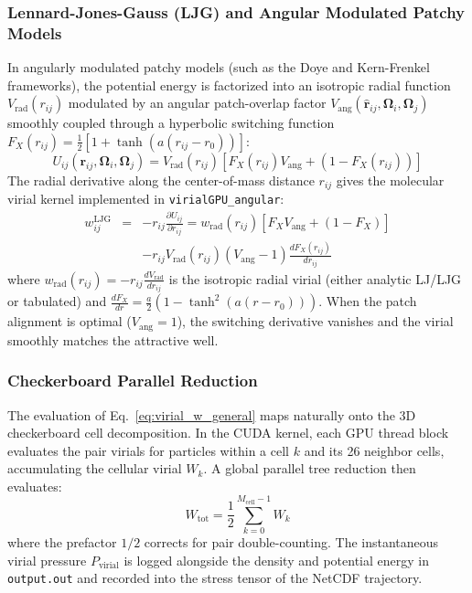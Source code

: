 \documentclass[final,5p,times,twocolumn]{elsarticle}
\begin{document}
\subsubsection{Lennard-Jones-Gauss (LJG) and Angular Modulated Patchy Models}
In angularly modulated patchy models (such as the Doye and Kern-Frenkel frameworks), the potential energy is factorized into an isotropic radial function $V_{\text{rad}}(r_{ij})$ modulated by an angular patch-overlap factor $V_{\text{ang}}(\hat{\mathbf{r}}_{ij}, \mathbf{\Omega}_i, \mathbf{\Omega}_j)$ smoothly coupled through a hyperbolic switching function $F_X(r_{ij}) = \frac{1}{2}\left[1 + \tanh(a(r_{ij} - r_0))\right]$:
\begin{equation}
    U_{ij}(\mathbf{r}_{ij}, \mathbf{\Omega}_i, \mathbf{\Omega}_j) = V_{\text{rad}}(r_{ij}) \left[ F_X(r_{ij}) V_{\text{ang}} + (1 - F_X(r_{ij})) \right]
\end{equation}
The radial derivative along the center-of-mass distance $r_{ij}$ gives the molecular virial kernel implemented in \texttt{virialGPU\_angular}:
\begin{eqnarray}
  w_{ij}^{\text{LJG}} &=& -r_{ij} \frac{\partial U_{ij}}{\partial r_{ij}} = w_{\text{rad}}(r_{ij}) \left[ F_X V_{\text{ang}} + (1 - F_X) \right]\nonumber \\
  & & - r_{ij} V_{\text{rad}}(r_{ij}) (V_{\text{ang}} - 1) \frac{dF_X(r_{ij})}{dr_{ij}}
\end{eqnarray}
where $w_{\text{rad}}(r_{ij}) = -r_{ij} \frac{dV_{\text{rad}}}{dr_{ij}}$ is the isotropic radial virial (either analytic LJ/LJG or tabulated) and $\frac{dF_X}{dr} = \frac{a}{2}(1 - \tanh^2(a(r - r_0)))$. When the patch alignment is optimal ($V_{\text{ang}} = 1$), the switching derivative vanishes and the virial smoothly matches the attractive well.

\subsubsection{Checkerboard Parallel Reduction}
The evaluation of Eq.~\eqref{eq:virial_w_general} maps naturally onto the 3D checkerboard cell decomposition. In the CUDA kernel, each GPU thread block evaluates the pair virials for particles within a cell $k$ and its 26 neighbor cells, accumulating the cellular virial $W_k$. A global parallel tree reduction then evaluates:
\begin{equation}
    W_{\text{tot}} = \frac{1}{2} \sum_{k=0}^{M_{\text{cell}}-1} W_k
\end{equation}
where the prefactor $1/2$ corrects for pair double-counting. The instantaneous virial pressure $P_{\text{virial}}$ is logged alongside the density and potential energy in \texttt{output.out} and recorded into the stress tensor of the NetCDF trajectory.
\end{document}

